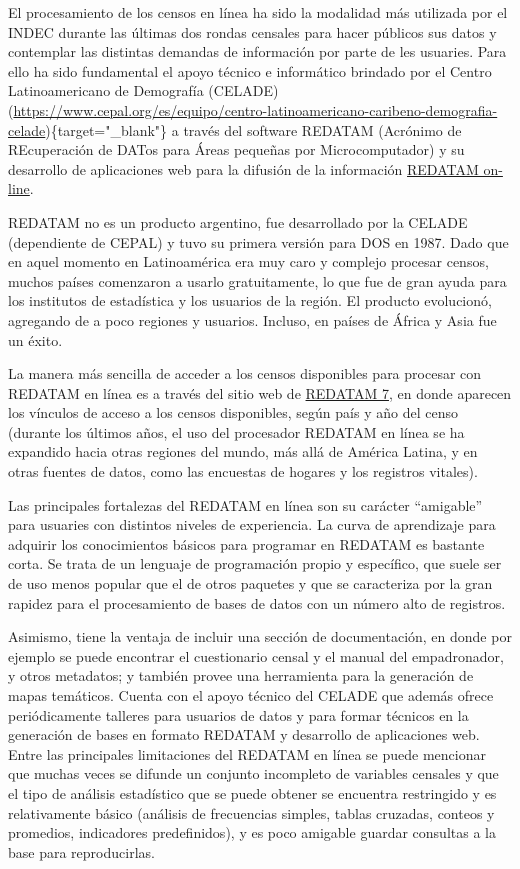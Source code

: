 \documentclass[
]{book}
\begin{document}
El procesamiento de los censos en línea ha sido la modalidad más utilizada por el INDEC durante las últimas dos rondas censales para hacer públicos sus datos y contemplar las distintas demandas de información por parte de les usuaries. Para ello ha sido fundamental el apoyo técnico e informático brindado por el Centro Latinoamericano de Demografía (CELADE)(\url{https://www.cepal.org/es/equipo/centro-latinoamericano-caribeno-demografia-celade})\{target="\_blank"\} a través del software REDATAM (Acrónimo de REcuperación de DATos para Áreas pequeñas por Microcomputador) y su desarrollo de aplicaciones web para la difusión de la información \href{https://www.cepal.org/cgi-bin/getprod.asp?xml=/redatam/noticias/paginas/5/14185/P14185.xml\&xsl=/redatam/tpl/p18f.xsl\&base=/redatam/tpl/top-bottom.xsl}{REDATAM on-line}.

REDATAM no es un producto argentino, fue desarrollado por la CELADE (dependiente de CEPAL) y tuvo su primera versión para DOS en 1987. Dado que en aquel momento en Latinoamérica era muy caro y complejo procesar censos, muchos países comenzaron a usarlo gratuitamente, lo que fue de gran ayuda para los institutos de estadística y los usuarios de la región. El producto evolucionó, agregando de a poco regiones y usuarios. Incluso, en países de África y Asia fue un éxito.

La manera más sencilla de acceder a los censos disponibles para procesar con REDATAM en línea es a través del sitio web de \href{https://www.cepal.org/es/temas/redatam/download-redatam}{REDATAM 7}, en donde aparecen los vínculos de acceso a los censos disponibles, según país y año del censo (durante los últimos años, el uso del procesador REDATAM en línea se ha expandido hacia otras regiones del mundo, más allá de América Latina, y en otras fuentes de datos, como las encuestas de hogares y los registros vitales).

Las principales fortalezas del REDATAM en línea son su carácter ``amigable'' para usuaries con distintos niveles de experiencia. La curva de aprendizaje para adquirir los conocimientos básicos para programar en REDATAM es bastante corta. Se trata de un lenguaje de programación propio y específico, que suele ser de uso menos popular que el de otros paquetes y que se caracteriza por la gran rapidez para el procesamiento de bases de datos con un número alto de registros.

Asimismo, tiene la ventaja de incluir una sección de documentación, en donde por ejemplo se puede encontrar el cuestionario censal y el manual del empadronador, y otros metadatos; y también provee una herramienta para la generación de mapas temáticos. Cuenta con el apoyo técnico del CELADE que además ofrece periódicamente talleres para usuarios de datos y para formar técnicos en la generación de bases en formato REDATAM y desarrollo de aplicaciones web. Entre las principales limitaciones del REDATAM en línea se puede mencionar que muchas veces se difunde un conjunto incompleto de variables censales y que el tipo de análisis estadístico que se puede obtener se encuentra restringido y es relativamente básico (análisis de frecuencias simples, tablas cruzadas, conteos y promedios, indicadores predefinidos), y es poco amigable guardar consultas a la base para reproducirlas.
\end{document}
